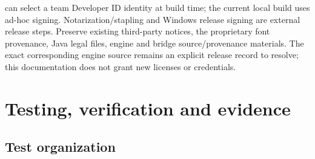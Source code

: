  can select a team Developer ID identity at build time;
the current local build uses ad-hoc signing. Notarization/stapling and Windows
release signing are external release steps. Preserve existing third-party
notices, the proprietary font provenance, Java legal files, engine and bridge
source/provenance materials. The exact corresponding engine source remains an
explicit release record to resolve; this documentation does not grant new
licenses or credentials.

\section{Testing, verification and evidence}\label{sec:tests}
\subsection{Test organization}
